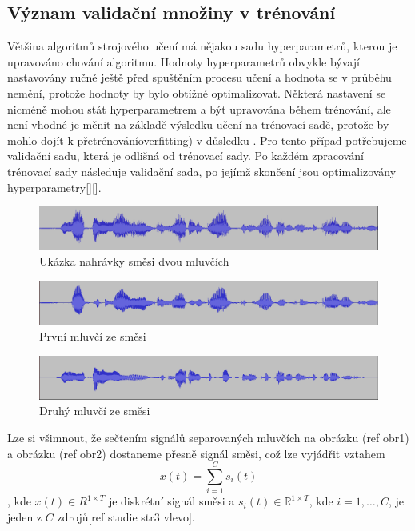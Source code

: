 \subsection{Význam validační množiny v trénování}
Většina algoritmů strojového učení má nějakou sadu hyperparametrů, kterou je upravováno chování algoritmu. Hodnoty hyperparametrů obvykle bývají nastavovány ručně ještě před spuštěním procesu učení a hodnota se v průběhu nemění, protože hodnoty by bylo obtížné optimalizovat. 
Některá nastavení se nicméně mohou stát hyperparametrem a být upravována během trénování, ale není vhodné je měnit na základě výsledku učení na trénovací sadě, protože by mohlo dojít k přetrénováníoverfitting) v důsledku . Pro tento případ potřebujeme validační sadu, která je odlišná od trénovací sady.
Po každém zpracování trénovací sady následuje validační sada, po jejímž skončení jsou optimalizovány hyperparametry[][].
\begin{figure}[H]
    \centering
    \includegraphics[scale=0.35]{obrazky-figures/dataset-mix.png}
    \caption{\label{fig:ref-mixture}Ukázka nahrávky směsi dvou mluvčích}
\end{figure}
\begin{figure}[H]
    \centering
    \includegraphics[scale=0.35]{obrazky-figures/dataset-s1.png}
    \caption{\label{fig:ref-s1}První mluvčí ze směsi}
\end{figure}
\begin{figure}[H]
    \centering
    \includegraphics[scale=0.35]{obrazky-figures/dataset-s2.png}
    \caption{\label{fig:ref-s2}Druhý mluvčí ze směsi}
\end{figure}
Lze si všimnout, že sečtením signálů separovaných mluvčích na obrázku (ref obr1) a obrázku (ref obr2) dostaneme přesně signál směsi, což lze vyjádřit vztahem
\begin{equation}
  x(t) = \sum_{i=1}^C s_i(t)
\end{equation}
, kde $x(t) \in R^{1 \times T}$ je diskrétní signál směsi a $s_i(t) \in \mathbb{R}^{1 \times T}$, kde $i = 1,\ldots,C$, je jeden z $C$ zdrojů[ref studie str3 vlevo]. 

